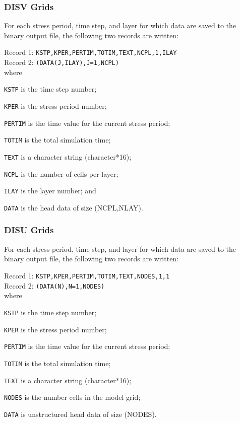 \subsubsection{DISV Grids}
For each stress period, time step, and layer for which data are saved to the binary output file, the following two records are written:

\vspace{5mm}
\noindent Record 1: \texttt{KSTP,KPER,PERTIM,TOTIM,TEXT,NCPL,1,ILAY} \\
\noindent Record 2: \texttt{(DATA(J,ILAY),J=1,NCPL)} \\

\vspace{5mm}
\noindent where

\begin{description} \itemsep0pt \parskip0pt 
\item \texttt{KSTP} is the time step number;
\item \texttt{KPER} is the stress period number;
\item \texttt{PERTIM} is the time value for the current stress period; 
\item \texttt{TOTIM} is the total simulation time;
\item \texttt{TEXT} is a character string (character*16);
\item \texttt{NCPL} is the number of cells per layer;
\item \texttt{ILAY} is the layer number; and
\item \texttt{DATA} is the head data of size (NCPL,NLAY).
\end{description}

\newpage
\subsubsection{DISU Grids}
For each stress period, time step, and layer for which data are saved to the binary output file, the following two records are written:

\vspace{5mm}
\noindent Record 1: \texttt{KSTP,KPER,PERTIM,TOTIM,TEXT,NODES,1,1} \\
\noindent Record 2: \texttt{(DATA(N),N=1,NODES)} \\

\vspace{5mm}
\noindent where

\begin{description} \itemsep0pt \parskip0pt 
\item \texttt{KSTP} is the time step number;
\item \texttt{KPER} is the stress period number;
\item \texttt{PERTIM} is the time value for the current stress period; 
\item \texttt{TOTIM} is the total simulation time;
\item \texttt{TEXT} is a character string (character*16);
\item \texttt{NODES} is the number cells in the model grid;
\item \texttt{DATA} is unstructured head data of size (NODES).
\end{description}

